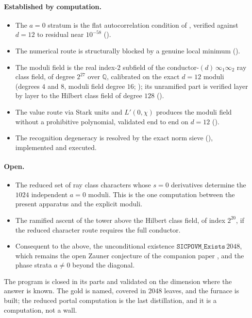 \documentclass[12pt,a4paper]{article}
\begin{document}
\paragraph{Established by computation.}
\begin{itemize}
\item The $a=0$ stratum is the flat autocorrelation condition of
, verified against $d=12$ to residual near $10^{-58}$
().
\item The numerical route is structurally blocked by a genuine local minimum
().
\item The moduli field is the real index-$2$ subfield of the
conductor-$(d)\,\infty_1\infty_2$ ray class field, of degree $2^{27}$ over
$\mathbb{Q}$, calibrated on the exact $d=12$ moduli (degrees $4$ and $8$,
moduli field degree $16$; ); its unramified part is verified layer by layer to the
Hilbert class field of degree $128$ ().
\item The value route via Stark units and $L'(0,\chi)$ produces the moduli field
without a prohibitive polynomial, validated end to end on $d=12$
().
\item The recognition degeneracy is resolved by the exact norm sieve
(), implemented and executed.
\end{itemize}

\paragraph{Open.}
\begin{itemize}
\item The reduced set of ray class characters whose $s=0$ derivatives determine
the $1024$ independent $a=0$ moduli. This is the one computation between the
present apparatus and the explicit moduli.
\item The ramified ascent of the tower above the Hilbert class field, of index
$2^{20}$, if the reduced character route requires the full conductor.
\item Consequent to the above, the unconditional existence
$\texttt{SICPOVM\_Exists}\,2048$, which remains the open Zauner conjecture of the
companion paper \cite{StarkHilbert12}, and the phase strata $a\neq 0$ beyond the
diagonal.
\end{itemize}

The program is closed in its parts and validated on the dimension where the
answer is known. The gold is named, covered in 2048 leaves, and the furnace is built; the reduced portal
computation is the last distillation, and it is a computation, not a wall.
\end{document}
